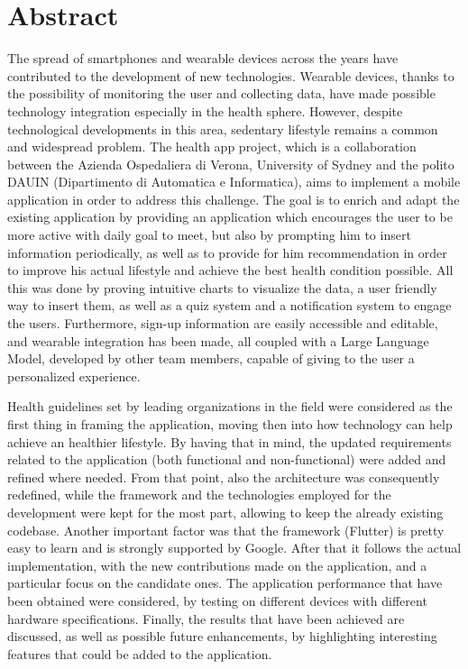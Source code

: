 \section{Abstract}

The spread of smartphones and wearable devices across the years have contributed to the development of new technologies. Wearable devices, thanks to the possibility of monitoring the user and collecting data, have made possible technology integration especially in the health sphere. However, despite technological developments in this area, sedentary lifestyle remains a common and widespread problem. The health app project, which is a collaboration between the Azienda Ospedaliera di Verona, University of Sydney and the polito DAUIN (Dipartimento di Automatica e Informatica), aims to implement a mobile application in order to address this challenge. The goal is to enrich and adapt the existing application by providing an application which encourages the user to be more active with daily goal to meet, but also by prompting him to insert information periodically, as well as to provide for him recommendation in order to improve his actual lifestyle and achieve the best health condition possible. All this was done by proving intuitive charts to visualize the data, a user friendly way to insert them, as well as a quiz system and a notification system to engage the users. Furthermore, sign-up information are easily accessible and editable, and wearable integration has been made, all coupled with a Large Language Model, developed by other team members, capable of giving to the user a personalized experience.

\noindent Health guidelines set by leading organizations in the field were considered as the first thing in framing the application, moving then into how technology can help achieve an healthier lifestyle. By having that in mind, the updated requirements related to the application (both functional and non-functional) were added and refined where needed. From that point, also the architecture was consequently redefined, while the framework and the technologies employed for the development were kept for the most part, allowing to keep the already existing codebase. Another important factor was that the framework (Flutter) is pretty easy to learn and is strongly supported by Google. After that it follows the actual implementation, with the new contributions made on the application, and a particular focus on the candidate ones. The application performance that have been obtained were considered, by testing on different devices with different hardware specifications. Finally, the results that have been achieved are discussed, as well as possible future enhancements, by highlighting interesting features that could be added to the application. 
